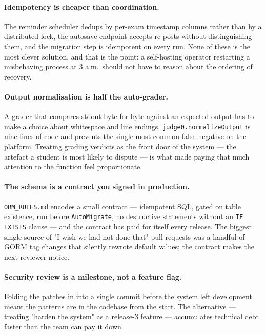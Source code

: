 \paragraph{Idempotency is cheaper than coordination.} The reminder scheduler dedups by per-exam timestamp columns rather than by a distributed lock, the autosave endpoint accepts re-posts without distinguishing them, and the migration step is idempotent on every run. None of these is the most clever solution, and that is the point: a self-hosting operator restarting a misbehaving process at 3 a.m.\ should not have to reason about the ordering of recovery.

\paragraph{Output normalisation is half the auto-grader.} A grader that compares stdout byte-for-byte against an expected output has to make a choice about whitespace and line endings. \texttt{judge0.normalizeOutput} is nine lines of code and prevents the single most common false negative on the platform. Treating grading verdicts as the front door of the system --- the artefact a student is most likely to dispute --- is what made paying that much attention to the function feel proportionate.

\paragraph{The schema is a contract you signed in production.} \texttt{ORM\_RULES.md} encodes a small contract --- idempotent SQL, gated on table existence, run before \texttt{AutoMigrate}, no destructive statements without an \texttt{IF EXISTS} clause --- and the contract has paid for itself every release. The biggest single source of "I wish we had not done that" pull requests was a handful of GORM tag changes that silently rewrote default values; the contract makes the next reviewer notice.

\paragraph{Security review is a milestone, not a feature flag.} Folding the patches in  into a single commit before the system left development meant the patterns are in the codebase from the start. The alternative --- treating "harden the system" as a release-3 feature --- accumulates technical debt faster than the team can pay it down.

